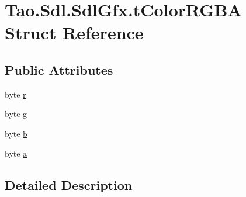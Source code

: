 \hypertarget{struct_tao_1_1_sdl_1_1_sdl_gfx_1_1t_color_r_g_b_a}{
\section{Tao.Sdl.SdlGfx.tColorRGBA Struct Reference}
\label{struct_tao_1_1_sdl_1_1_sdl_gfx_1_1t_color_r_g_b_a}
}
\subsection*{Public Attributes}
\begin{DoxyCompactItemize}
\item 
byte \hyperlink{struct_tao_1_1_sdl_1_1_sdl_gfx_1_1t_color_r_g_b_a_ae5b3ea66dc2bf732f4818d626bd3c0d3}{r}
\item 
byte \hyperlink{struct_tao_1_1_sdl_1_1_sdl_gfx_1_1t_color_r_g_b_a_a2c313132f0c8d220f1a25e0a15a24e89}{g}
\item 
byte \hyperlink{struct_tao_1_1_sdl_1_1_sdl_gfx_1_1t_color_r_g_b_a_aa9021fb76dad99065dca1cbf49481041}{b}
\item 
byte \hyperlink{struct_tao_1_1_sdl_1_1_sdl_gfx_1_1t_color_r_g_b_a_a59ae5d6b3a06cf02e6ccabf29cffd8b8}{a}
\end{DoxyCompactItemize}


\subsection{Detailed Description}


